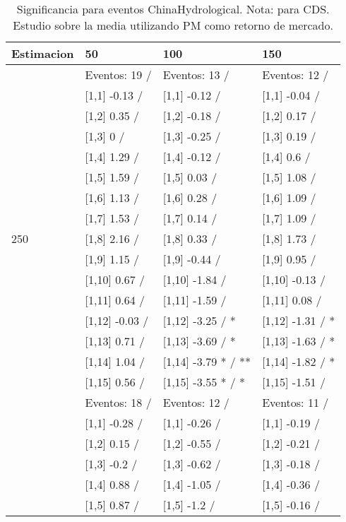 \begin{table}

\caption{Significancia para eventos ChinaHydrological. Nota: para CDS. Estudio sobre la media utilizando PM como retorno de mercado.}
\centering
\begin{tabular}[t]{llll}
\toprule
Estimacion & 50 & 100 & 150\\
\midrule
 & Eventos:  19 / & Eventos:  13 / & Eventos:  12 /\\
 & {}[1,1] -0.13  / & {}[1,1] -0.12  / & {}[1,1] -0.04  /\\
 & {}[1,2] 0.35  / & {}[1,2] -0.18  / & {}[1,2] 0.17  /\\
 & {}[1,3] 0  / & {}[1,3] -0.25  / & {}[1,3] 0.19  /\\
 & {}[1,4] 1.29  / & {}[1,4] -0.12  / & {}[1,4] 0.6  /\\
\addlinespace
 & {}[1,5] 1.59  / & {}[1,5] 0.03  / & {}[1,5] 1.08  /\\
 & {}[1,6] 1.13  / & {}[1,6] 0.28  / & {}[1,6] 1.09  /\\
 & {}[1,7] 1.53  / & {}[1,7] 0.14  / & {}[1,7] 1.09  /\\
250 & {}[1,8] 2.16  / & {}[1,8] 0.33  / & {}[1,8] 1.73  /\\
 & {}[1,9] 1.15  / & {}[1,9] -0.44  / & {}[1,9] 0.95  /\\
\addlinespace
 & {}[1,10] 0.67  / & {}[1,10] -1.84  / & {}[1,10] -0.13  /\\
 & {}[1,11] 0.64  / & {}[1,11] -1.59  / & {}[1,11] 0.08  /\\
 & {}[1,12] -0.03  / & {}[1,12] -3.25  / * & {}[1,12] -1.31  / *\\
 & {}[1,13] 0.71  / & {}[1,13] -3.69  / * & {}[1,13] -1.63  / *\\
 & {}[1,14] 1.04  / & {}[1,14] -3.79 * / ** & {}[1,14] -1.82  / *\\
\addlinespace
 & {}[1,15] 0.56  / & {}[1,15] -3.55 * / * & {}[1,15] -1.51  /\\
 & Eventos:  18 / & Eventos:  12 / & Eventos:  11 /\\
 & {}[1,1] -0.28  / & {}[1,1] -0.26  / & {}[1,1] -0.19  /\\
 & {}[1,2] 0.15  / & {}[1,2] -0.55  / & {}[1,2] -0.21  /\\
 & {}[1,3] -0.2  / & {}[1,3] -0.62  / & {}[1,3] -0.18  /\\
\addlinespace
 & {}[1,4] 0.88  / & {}[1,4] -1.05  / & {}[1,4] -0.36  /\\
 & {}[1,5] 0.87  / & {}[1,5] -1.2  / & {}[1,5] -0.16  /\\

\end{tabular}
\end{table}
